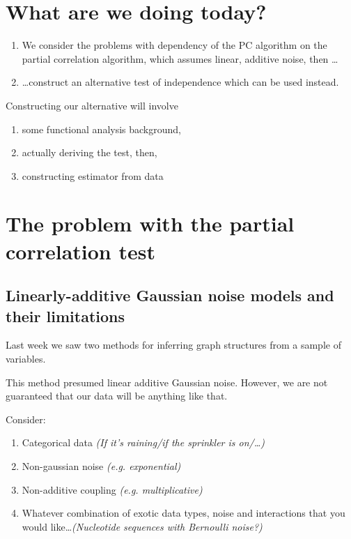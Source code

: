 \section{What are we doing today?}
\begin{enumerate}
	\item We consider the problems with dependency of the PC algorithm on the partial correlation algorithm, which assumes linear, additive noise, then \ldots
	\item\ldots construct an alternative test of independence which can be used instead.
\end{enumerate}
\clearpage
Constructing our alternative will involve
\begin{enumerate}
	\item some functional analysis background,
	\item actually deriving the test, then,
	\item constructing estimator from data
\end{enumerate}
\clearpage

\section{The problem with the partial correlation test}

\subsection{Linearly-additive Gaussian noise models and their limitations}
Last week we saw two methods for inferring graph structures from a sample of variables.

This method presumed linear additive Gaussian noise. However, we are not guaranteed that our data will be anything like that.

\clearpage
Consider:
\begin{enumerate}
\item Categorical data \emph{(If it's raining/if the sprinkler is on/\ldots)}
\item Non-gaussian noise \emph{(e.g. exponential)}
\item Non-additive coupling \emph{(e.g. multiplicative)}
\item Whatever combination of exotic data types, noise and interactions that you would like\dots \emph{(Nucleotide sequences with Bernoulli noise?)}
\end{enumerate}
\clearpage
